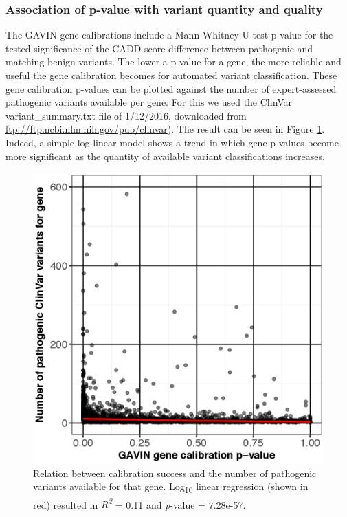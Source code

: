\subsubsection*{Association of p-value with variant quantity and quality}

The GAVIN gene calibrations include a Mann-Whitney U test p-value for the tested significance of the CADD score difference between pathogenic and matching benign variants.
The lower a p-value for a gene, the more reliable and useful the gene calibration becomes for automated variant classification.
These gene calibration p-values can be plotted against the number of expert-assessed pathogenic variants available per gene.
For this we used the ClinVar variant\_summary.txt file of 1/12/2016, downloaded from \url{ftp://ftp.ncbi.nlm.nih.gov/pub/clinvar}).
The result can be seen in Figure \ref{fig:discussion_nrofvariantsvspvalue}.
Indeed, a simple log-linear model shows a trend in which gene p-values become more significant as the quantity of available variant classifications increases.

\begin{figure}
\centering
\includegraphics[scale=0.8]{img/discussion_nrofvariantsvspvalue}
\caption[Relation between calibration and number variants]{Relation between calibration success and the number of pathogenic variants available for that gene. Log\textsubscript{10} linear regression (shown in red) resulted in \textsl{R\textsuperscript{2}} = 0.11 and \textsl{p}-value = 7.28e-57.}
\label{fig:discussion_nrofvariantsvspvalue}
\end{figure}

